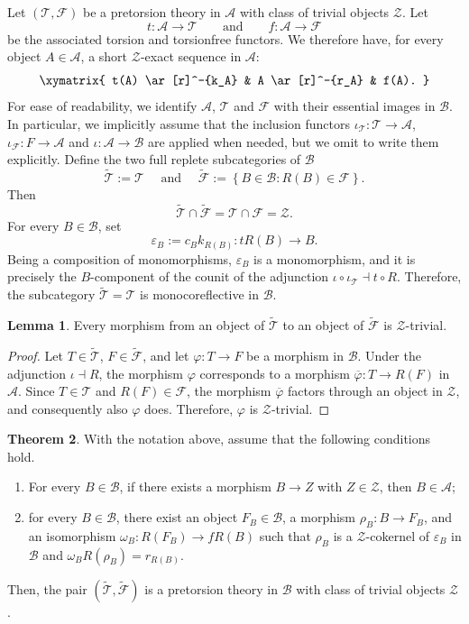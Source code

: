 \documentclass[a4paper,10pt,reqno]{amsart}
\theoremstyle{definition}
\newtheorem{theorem}{Theorem}[section]
\newtheorem{lemma}[theorem]{Lemma}
\theoremstyle{remark}
\newcommand{\Cal}[1]{\mathcal{#1}}
\begin{document}
Let $(\Cal T,\Cal F)$ be a pretorsion theory in $\Cal A$ with class of trivial objects $\Cal Z$. Let
$$
t\colon\Cal A\to\Cal T \qquad \text{and} \qquad f\colon \Cal A \to \Cal F
$$
be the associated torsion and torsionfree functors. We therefore have, for every object $A \in \Cal A$, a short $\Cal Z$-exact sequence in $\Cal A$:
$$
\xymatrix{
t(A) \ar[r]^-{k_A} & A \ar[r]^-{r_A} & f(A).
}
$$
For ease of readability, we identify $\Cal A$, $\Cal T$ and $\Cal F$ with their essential images in $\Cal B$. In particular, we implicitly assume that the inclusion functors $\iota_\Cal T\colon \Cal T \to \Cal A$, $\iota_\Cal F\colon F \to \Cal A$ and $\iota\colon \Cal A \to \Cal B$ are applied when needed, but we omit to write them explicitly. Define the two full replete subcategories of $\Cal B$
$$
\widetilde{\Cal T}:=\Cal T\quad \text{ and }\quad
\widetilde{\Cal F}
:=
\left\{
B\in\Cal B:R(B)\in\Cal F
\right\}.
$$
Then
$$
\widetilde{\Cal T}\cap\widetilde{\Cal F}=\Cal T\cap\Cal F=\Cal Z.
$$
For every $B\in\Cal B$, set
$$
\varepsilon_B
:=
c_B k_{R(B)}
\colon
tR(B)\to B.
$$
Being a composition of monomorphisms, $\varepsilon_B$ is a monomorphism, and it is precisely the $B$-component of the counit of the adjunction $\iota \circ \iota_\Cal T \dashv t\circ R$. Therefore, the subcategory $\widetilde{\Cal T}=\Cal T$ is monocoreflective in $\Cal B$.



\begin{lemma}\label{lem:lifted-torsion-coreflection}
Every morphism from an object of $\widetilde{\Cal T}$ to an object of $\widetilde{\Cal F}$ is $\Cal Z$-trivial.
\end{lemma}

\begin{proof}
Let $T\in\widetilde{\Cal T}$, $F\in\widetilde{\Cal F}$, and let $\varphi\colon T\to F$ be a morphism in $\Cal B$. Under the adjunction $\iota\dashv R$, the morphism $\varphi$ corresponds to a morphism $\overline \varphi\colon T\to R(F)$ in $\Cal A$. Since $T\in\Cal T$ and $R(F)\in\Cal F$, the morphism $\overline \varphi$ factors through an object in $\Cal Z$, and consequently also $\varphi$ does. Therefore, $\varphi$ is $\Cal Z$-trivial.
\end{proof}

\begin{theorem}\label{thm:lifting-torsion-theory}
With the notation above, assume that the following conditions hold.
\begin{enumerate}[label=\textup{(\arabic*)}]
    \item\label{thm:lifting-torsion-theory 1}
    For every $B \in \Cal B$, if there exists a morphism $B \to Z$ with $Z \in \Cal Z$, then $B \in \Cal A$;
    \item\label{thm:lifting-torsion-theory 2}
    for every $B\in\Cal B$, there exist an object $F_B\in\Cal B$, a morphism $\rho_B\colon B\to F_B$, and an isomorphism $\omega_B\colon R(F_B)\to fR(B)$ such that $\rho_B$ is a $\Cal Z$-cokernel of $\varepsilon_B$ in $\Cal B$ and $\omega_B R(\rho_B)=r_{R(B)}$.
\end{enumerate}
Then, the pair $(\widetilde{\Cal T},\widetilde{\Cal F})$ is a pretorsion theory in $\Cal B$ with class of trivial objects $\Cal Z$.
\end{theorem}
\end{document}
